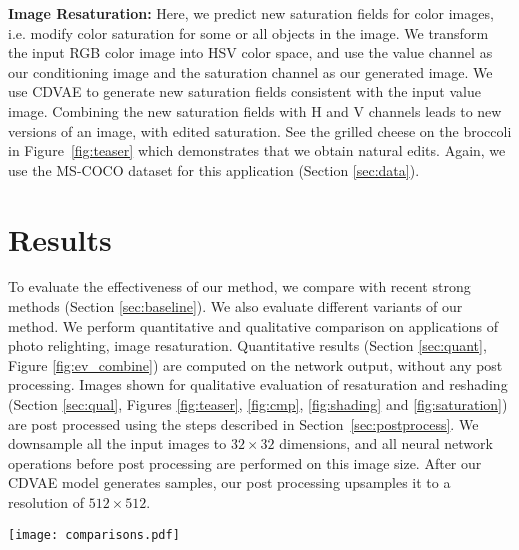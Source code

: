 \documentclass[10pt,twocolumn,letterpaper]{article}
\begin{document}
{\bf Image Resaturation:} Here, we predict new saturation fields for color images, i.e.\we 
modify color saturation for some or all objects in the image.  We transform the input RGB color image into 
HSV color space, and use the value channel as our conditioning image and the saturation channel as our 
generated image.  We use CDVAE to generate new saturation fields consistent with the input value image. 
Combining the new saturation fields with H and V channels leads to new versions of an image, 
with edited saturation. See the grilled cheese on the broccoli in Figure~\ref{fig:teaser} which demonstrates
that we obtain natural edits. Again, we use the MS-COCO dataset for this application (Section \ref{sec:data}).

\section{Results}
\label{sec:result}
To evaluate the effectiveness of our method, we compare with recent strong methods (Section \ref{sec:baseline}). 
We also evaluate different variants of our method. We perform quantitative and qualitative comparison on 
applications of photo relighting, image resaturation. Quantitative results (Section \ref{sec:quant}, Figure \ref{fig:ev_combine}) are 
computed on the network output, without any post processing.  Images shown for qualitative evaluation of 
resaturation and reshading (Section \ref{sec:qual}, Figures \ref{fig:teaser}, \ref{fig:cmp}, \ref{fig:shading} and \ref{fig:saturation}) 
are post processed using the steps described in Section~\ref{sec:postprocess}. We downsample all the 
input images to $32 \times 32$ dimensions, and all neural network operations before post processing are 
performed on this image size. After our CDVAE model generates samples, our post processing upsamples 
it to a resolution of $512 \times 512$. 

\begin{figure*}[ht]
\centerline{  \texttt{[image: comparisons.pdf]}}
  \caption{Qualitative comparisons for Photo Relighting (top) and Image Resaturation (bottom). The first column is the input image. 
  Nearest neighbor creates inconsistent visual artifacts, since it is a non-parametric method with little awareness
  of the content and spatial structure. CVAE generates low diversity. Notice the diversity in outputs of PixelCNN
  and CGANs is also limited. In contrast, our CDVAE generates two plausible different relighted scenes and it 
  generates two reasonable resaturation outputs (high and low saturation) different from original input . Note that, 
  without the embedding constraint (CDVAE noembed), we observe code collapse and same predictions.}
  \label{fig:cmp}
\end{figure*}
\end{document}
